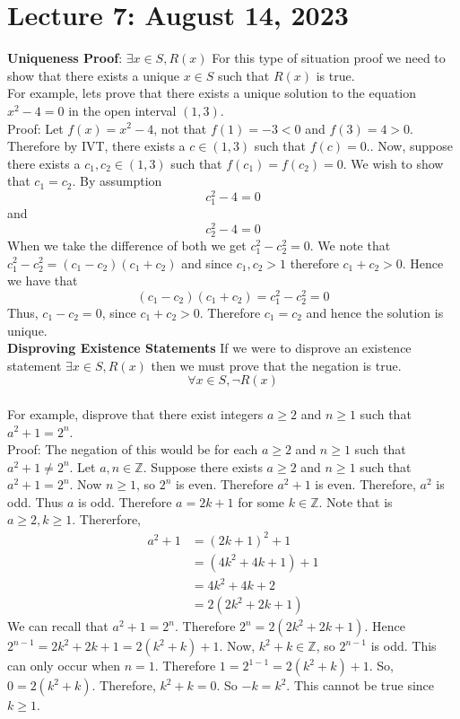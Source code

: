 \documentclass{article}
\begin{document}
\section{Lecture 7: August 14, 2023}
\textbf{Uniqueness Proof}: \(\exists x \in S, R(x)\) For this type of situation proof we need to show that there exists a unique \(x \in S\) such that \(R(x)\) is true.\\
For example, lets prove that there exists a unique solution to the equation \(x^2 - 4 = 0\) in the open interval \((1,3)\).\\
Proof: Let \(f(x) = x^2 - 4\), not that \(f(1) = -3 < 0\) and \(f(3) = 4 > 0\). Therefore by IVT, there exists a \(c \in (1,3)\) such that \(f(c) = 0.\). Now, suppose there exists a \(c_1,c_2 \in (1,3)\) such that \(f(c_1) = f(c_2) = 0\). We wish to show that \(c_1 = c_2\). By assumption
\[c^{2}_1-4 = 0\] and \[c^{2}_2 - 4 = 0\]
When we take the difference of both we get \(c^{2}_1-c^{2}_2 = 0\). We note that \(c^{2}_1-c^{2}_2 = (c_1-c_2)(c_1+c_2)\) and since \(c_1,c_2  > 1\) therefore \(c_1+c_2 > 0\). Hence we have that 
\[(c_1-c_2)(c_1+c_2) = c^{2}_1-c^{2}_2 = 0\]
Thus, \(c_1-c_2 = 0\), since \(c_1+c_2 > 0\). Therefore \(c_1 = c_2\) and hence the solution is unique.\\
\textbf{Disproving Existence Statements} If we were to disprove an existence statement  \(\exists x \in S, R(x)\) then we must prove that the negation is true. \[\forall x \in S, \neg R(x)\]\\
For example, disprove that there exist integers \(a \geq 2\) and \(n \geq 1\) such that \(a^2 + 1 = 2^n\).\\
Proof: The negation of this would be for each \(a \geq 2\) and \(n \geq 1\) such that \(a^2 + 1 \neq 2^n\). Let \(a,n \in \mathbb{Z}\). Suppose there exists \(a \geq 2\) and \(n \geq 1\) such that \(a^2 + 1 = 2^n\). Now \(n \geq 1\), so \(2^n\) is even.
Therefore \(a^2 + 1\) is even. Therefore, \(a^2\) is odd. Thus \(a\) is odd. Therefore \(a = 2k+1\) for some \(k \in \mathbb{Z}\). Note that is \(a \geq 2, k \geq 1\). Thererfore,
\begin{align*}
    a^2 + 1 &= (2k+1)^2 + 1\\
    &= (4k^2+4k+1)+1\\
    &= 4k^2 + 4k + 2\\
    &= 2(2k^2 + 2k + 1)
\end{align*}
We can recall that \(a^2 + 1 = 2^n\). Therefore \(2^n = 2(2k^2+2k+1)\). Hence \(2^{n-1} = 2k^2 + 2k + 1 = 2(k^2+k)+1\).
Now, \(k^2+k \in \mathbb{Z}\), so \(2^{n-1}\) is odd. This can only occur when \(n = 1\). Therefore \(1 = 2^{1-1} = 2(k^2+k) + 1\). So, \(0 = 2(k^2+k)\). Therefore, \(k^2 + k = 0\). So \(- k = k^2\). This cannot be true since \(k \geq 1\).
\end{document}
